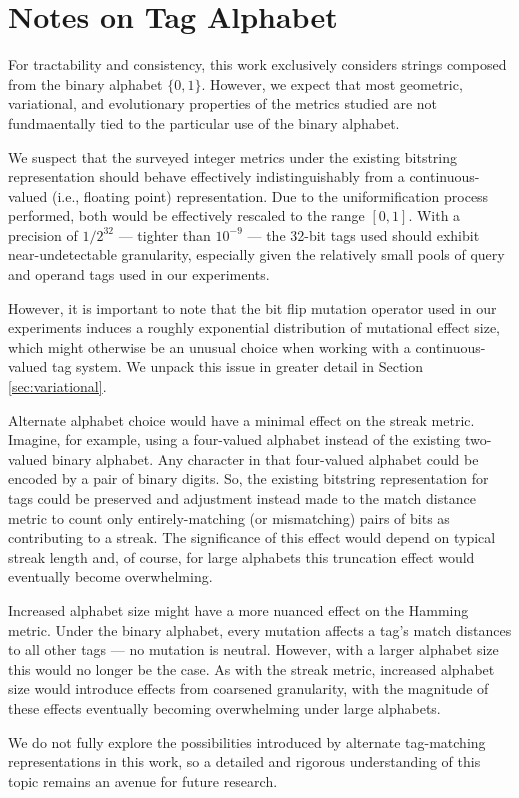 \section{Notes on Tag Alphabet} \label{sec:alphabet}

For tractability and consistency, this work exclusively considers strings composed from the binary alphabet $\{0, 1\}$.
However, we expect that most geometric, variational, and evolutionary properties of the metrics studied are not fundmaentally tied to the particular use of the binary alphabet.

We suspect that the surveyed integer metrics under the existing bitstring representation should behave effectively indistinguishably from a continuous-valued (i.e., floating point) representation.
Due to the uniformification process performed, both would be effectively rescaled to the range $[0, 1]$.
With a precision of $1/2^{32}$ --- tighter than $10^{-9}$ --- the 32-bit tags used should exhibit near-undetectable granularity, especially given the relatively small pools of query and operand tags used in our experiments.

However, it is important to note that the bit flip mutation operator used in our experiments induces a roughly exponential distribution of mutational effect size, which might otherwise be an unusual choice when working with a continuous-valued tag system.
We unpack this issue in greater detail in Section \ref{sec:variational}.

Alternate alphabet choice would have a minimal effect on the streak metric.
Imagine, for example, using a four-valued alphabet instead of the existing two-valued binary alphabet.
Any character in that four-valued alphabet could be encoded by a pair of binary digits.
So, the existing bitstring representation for tags could be preserved and adjustment instead made to the match distance metric to count only entirely-matching (or mismatching) pairs of bits as contributing to a streak.
The significance of this effect would depend on typical streak length and, of course, for large alphabets this truncation effect would eventually become overwhelming.

Increased alphabet size might have a more nuanced effect on the Hamming metric.
Under the binary alphabet, every mutation affects a tag's match distances to all other tags --- no mutation is neutral.
However, with a larger alphabet size this would no longer be the case.
As with the streak metric, increased alphabet size would introduce effects from coarsened granularity, with the magnitude of these effects eventually becoming overwhelming under large alphabets.

We do not fully explore the possibilities introduced by alternate tag-matching representations in this work, so a detailed and rigorous understanding of this topic remains an avenue for future research.
